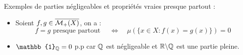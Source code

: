 \begin{example} Exemples de parties négligeables et propriétés vraies presque partout :
    \begin{itemize}
        \item  Soient $f,g \in \overline{\mathcal{M}_+(X)}$, on a :
            \[ f = g \text{ presque partout } \quad \Longleftrightarrow \quad \mu(\{x \in X : f(x) = g(x) \}) = 0 \] 
        \item $\mathbb{1}_\Q = 0$ p.p car $\mathbb{Q}$ est négligeable et $\mathbb{R} \backslash \mathbb{Q}$ est une partie pleine. 
    \end{itemize}
\end{example}

